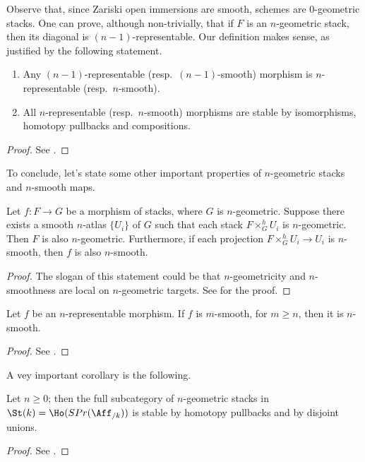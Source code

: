         Observe that, since Zariski open immersions are smooth, schemes are $0$-geometric stacks.
        One can prove, although non-trivially, that if $F$ is an $n$-geometric stack, then its diagonal is $(n-1)$-representable.
        Our definition makes sense, as justified by the following statement.
        \begin{prop}\hfill
            \label{prop:n_rep_bigger_n}
            \begin{enumerate}
                \item Any $(n-1)$-representable (resp.\ $(n-1)$-smooth) morphism is $n$-representable (resp.\ $n$-smooth).
                \item All $n$-representable (resp.\ $n$-smooth) morphisms are stable by isomorphisms, homotopy pullbacks and compositions.
            \end{enumerate}
        \end{prop}
        \begin{proof}
            See \cite[Proposition~1.3.3.3]{ToVe:hag2}.
        \end{proof}
        To conclude, let's state some other important properties of $n$-geometric stacks and $n$-smooth maps. 
        \begin{prop}
            \label{prop:n_geometric_local}
            Let $f\colon F \to G$ be a morphism of stacks, where $G$ is $n$-geometric. Suppose there exists a smooth $n$-atlas $\{U_i\}$ of $G$ such that each stack $F \times^h_G U_i$ is $n$-geometric. Then $F$ is also $n$-geometric.
            Furthermore, if each projection $F \times^h_G U_i \to U_i$ is $n$-smooth, then $f$ is also $n$-smooth.
        \end{prop}
        \begin{proof}
            The slogan of this statement could be that $n$-geometricity and $n$-smoothness are local on $n$-geometric targets. See \cite[Proposition~1.3.3.4]{ToVe:hag2} for the proof.
        \end{proof}
        \begin{prop}
            \label{prop:m_smooth_n_smooth}
            Let $f$ be an $n$-representable morphism. If $f$ is $m$-smooth, for $m \geq n$, then it is $n$-smooth.
        \end{prop}
        \begin{proof}
            See \cite[Proposition~1.3.3.6]{ToVe:hag2}.
        \end{proof}
        A vey important corollary is the following.
        \begin{corollary}
            \label{corollary:stability_n_geom_stacks}
            Let $n \geq 0$; then the full subcategory of $n$-geometric stacks in $\St(k) = \Ho(SPr(\Aff_{/k}))$ is stable by homotopy pullbacks and by disjoint unions.
        \end{corollary}
        \begin{proof}
            See \cite[Corollary~1.3.3.5]{ToVe:hag2}.
        \end{proof}

